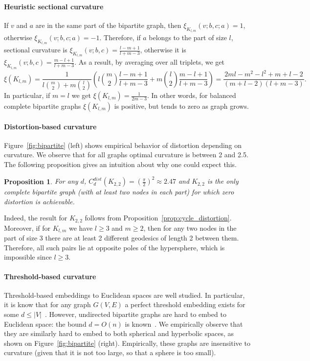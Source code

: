 \documentclass{article} %
\newtheorem{proposition}[theorem]{Proposition}
\begin{document}
\paragraph{Heuristic sectional curvature} If $v$ and $a$ are in the same part of the bipartite graph, then $\xi_{K_{l,m}}(v;b,c;a) = 1$, otherwise $\xi_{K_{l,m}}(v;b,c;a) = -1$. Therefore, if $a$ belongs to the part of size $l$, sectional curvature is
$\xi_{K_{l,m}}(v;b,c) = \frac{l-m+1}{l+m-3}$, otherwise it is $\xi_{K_{l,m}}(v;b,c) = \frac{m-l+1}{l+m-3}$. As a result, by averaging over all triplets, we get
\[
\xi({K_{l,m}}) = \frac{1}{l \binom{m}{2} + m \binom{l}{2}} \left(l \binom{m}{2} \frac{l-m+1}{l+m-3} + m \binom{l}{2} \frac{m-l+1}{l+m-3}\right) = \frac{2ml - m^2 - l^2 + m + l - 2}{(m+l-2)(l+m-3)}.
\]
In particular, if $m = l$ we get $\xi({K_{l,m}}) = \frac{1}{2m - 3}$. In other words, for balanced complete bipartite graphs $\xi({K_{l,m}})$ is positive, but tends to zero as graph grows.

\paragraph{Distortion-based curvature} 

Figure~\ref{fig:bipartite} (left) shows empirical behavior of distortion depending on curvature. We observe that for all graphs optimal curvature is between 2 and 2.5. 
The following proposition gives an intuition about why one could expect this. 

\begin{proposition}\label{prop:bipartite_distortion}
For any $d$, $C_d^{dist}(K_{2,2}) = \left(\frac{\pi}{2}\right)^2 \approx 2.47$ and $K_{2,2}$ is the only complete bipartite graph (with at least two nodes in each part) for which zero distortion is achievable.
\end{proposition}

Indeed, the result for $K_{2,2}$ follows from Proposition~\ref{prop:cycle_distortion}. Moreover, if for $K_{l,m}$ we have $l \ge 3$ and $m \ge 2$, then for any two nodes in the part of size 3 there are at least 2 different geodesics of length 2 between them. Therefore, all such pairs lie at opposite poles of the hypersphere, which is impossible since $l \ge 3$.

\paragraph{Threshold-based curvature} 
 
Threshold-based embeddings to Euclidean spaces are well studied. In particular, it is know that for any graph $G(V,E)$ a perfect threshold embedding  exists for some $d \le |V|$~\citep{maehara1984space}. 
However, undirected bipartite graphs are hard to embed to Euclidean space: the bound $d = O(n)$ is known~\citep{maehara1984space}. We empirically observe that they are similarly hard to embed to both spherical and hyperbolic spaces, as shown on Figure~\ref{fig:bipartite} (right). Empirically, these graphs are insensitive to curvature (given that it is not too large, so that a sphere is too small).
 
\end{document}
